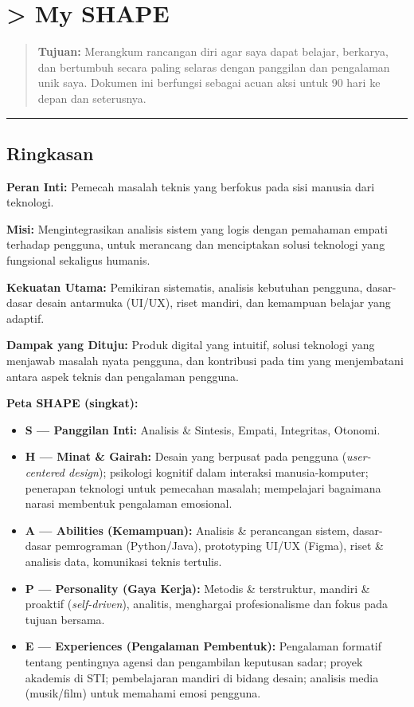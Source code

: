 \documentclass[
  letterpaper,
  DIV=11,
  numbers=noendperiod]{scrreprt}
\providecommand{\tightlist}{%
  \setlength{\itemsep}{0pt}\setlength{\parskip}{0pt}}
\begin{document}

\chapter{\textgreater{} My SHAPE}\label{my-shape}

\begin{quote}
\textbf{Tujuan:} Merangkum rancangan diri agar saya dapat belajar,
berkarya, dan bertumbuh secara paling selaras dengan panggilan dan
pengalaman unik saya. Dokumen ini berfungsi sebagai acuan aksi untuk 90
hari ke depan dan seterusnya.
\end{quote}

\begin{center}\rule{0.5\linewidth}{0.5pt}\end{center}

\section{Ringkasan}\label{ringkasan}

\textbf{Peran Inti:} Pemecah masalah teknis yang berfokus pada sisi
manusia dari teknologi.

\textbf{Misi:} Mengintegrasikan analisis sistem yang logis dengan
pemahaman empati terhadap pengguna, untuk merancang dan menciptakan
solusi teknologi yang fungsional sekaligus humanis.

\textbf{Kekuatan Utama:} Pemikiran sistematis, analisis kebutuhan
pengguna, dasar-dasar desain antarmuka (UI/UX), riset mandiri, dan
kemampuan belajar yang adaptif.

\textbf{Dampak yang Dituju:} Produk digital yang intuitif, solusi
teknologi yang menjawab masalah nyata pengguna, dan kontribusi pada tim
yang menjembatani antara aspek teknis dan pengalaman pengguna.

\textbf{Peta SHAPE (singkat):}

\begin{itemize}
\tightlist
\item
  \textbf{S --- Panggilan Inti:} Analisis \& Sintesis, Empati,
  Integritas, Otonomi.
\item
  \textbf{H --- Minat \& Gairah:} Desain yang berpusat pada pengguna
  (\emph{user-centered design}); psikologi kognitif dalam interaksi
  manusia-komputer; penerapan teknologi untuk pemecahan masalah;
  mempelajari bagaimana narasi membentuk pengalaman emosional.
\item
  \textbf{A --- Abilities (Kemampuan):} Analisis \& perancangan sistem,
  dasar-dasar pemrograman (Python/Java), prototyping UI/UX (Figma),
  riset \& analisis data, komunikasi teknis tertulis.
\item
  \textbf{P --- Personality (Gaya Kerja):} Metodis \& terstruktur,
  mandiri \& proaktif (\emph{self-driven}), analitis, menghargai
  profesionalisme dan fokus pada tujuan bersama.
\item
  \textbf{E --- Experiences (Pengalaman Pembentuk):} Pengalaman formatif
  tentang pentingnya agensi dan pengambilan keputusan sadar; proyek
  akademis di STI; pembelajaran mandiri di bidang desain; analisis media
  (musik/film) untuk memahami emosi pengguna.
\end{itemize}
\end{document}
